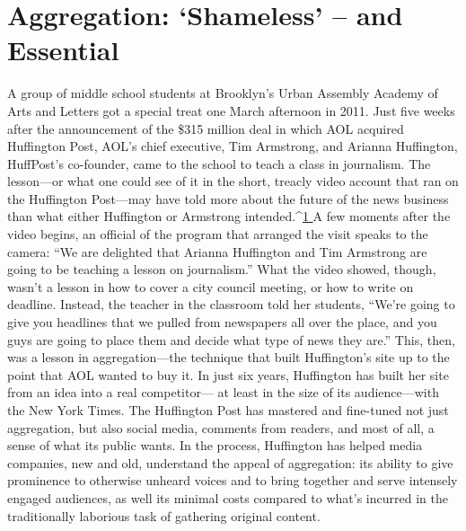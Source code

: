 \chapter{Aggregation: ‘Shameless’ – and Essential}
A group of middle school students at Brooklyn’s Urban Assembly Academy
of Arts and Letters got a special treat one March afternoon in 2011. Just five
weeks after the announcement of the \$315 million deal in which AOL acquired
Huffington Post, AOL’s chief executive, Tim Armstrong, and Arianna Huffington,
HuffPost’s co-founder, came to the school to teach a class in journalism.
The lesson—or what one could see of it in the short, treacly video account
that ran on the Huffington Post—may have told more about the future of the
news business than what either Huffington or Armstrong intended.^{\href{#endnotes-ch6}{1 }}A few moments
after the video begins, an official of the program that arranged the visit
speaks to the camera: ``We are delighted that Arianna Huffington and Tim Armstrong
are going to be teaching a lesson on journalism.'' What the video showed,
though, wasn’t a lesson in how to cover a city council meeting, or how to write
on deadline. Instead, the teacher in the classroom told her students, ``We’re going
to give you headlines that we pulled from newspapers all over the place, and you
guys are going to place them and decide what type of news they are.''
This, then, was a lesson in aggregation—the technique that built Huffington’s
site up to the point that AOL wanted to buy it.
In just six years, Huffington has built her site from an idea into a real competitor—
at least in the size of its audience—with the New York Times. The Huffington
Post has mastered and fine-tuned not just aggregation, but also social media,
comments from readers, and most of all, a sense of what its public wants. In the
process, Huffington has helped media companies, new and old, understand the
appeal of aggregation: its ability to give prominence to otherwise unheard voices
and to bring together and serve intensely engaged audiences, as well its minimal
costs compared to what’s incurred in the traditionally laborious task of gathering
original content.

